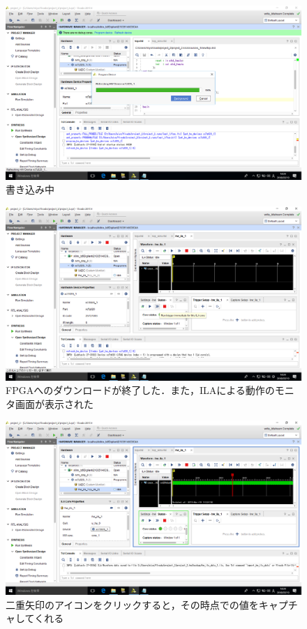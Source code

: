\documentclass[a4paper,dvipdfmx]{jsarticle}
\begin{document}
 \begin{figure}[H]
  \begin{center}
   \includegraphics[width=.8\textwidth]{chapter05_figures/VirtualBox_Windows10_19_03_2018_14_24_16.png}
  \end{center}
  \caption{書き込み中}
 \end{figure}

 \begin{figure}[H]
  \begin{center}
   \includegraphics[width=.8\textwidth]{chapter05_figures/VirtualBox_Windows10_19_03_2018_14_24_38.png}
  \end{center}
  \caption{FPGAへのダウンロードが終了した．また，ILAによる動作のモニタ画面が表示された}
 \end{figure}

 \begin{figure}[H]
  \begin{center}
   \includegraphics[width=.8\textwidth]{chapter05_figures/VirtualBox_Windows10_19_03_2018_14_24_53.png}
  \end{center}
  \caption{二重矢印のアイコンをクリックすると，その時点での値をキャプチャしてくれる}
 \end{figure}
\end{document}

